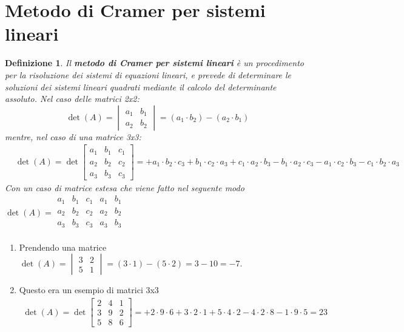 \documentclass{article}
\newtheorem{defi}{Definizione}[section]
\begin{document}
\section{Metodo di Cramer per sistemi lineari}
\label{sec:Metododicramer}
\begin{defi}
  Il \textbf{metodo di Cramer per sistemi lineari} è un procedimento per la
  risoluzione dei sistemi di equazioni lineari, e prevede di determinare le
  soluzioni dei sistemi lineari quadrati mediante il calcolo del determinante
  assoluto. Nel caso delle matrici 2x2:
  \begin{equation}
    \label{eq:MotododiCrmer}
    \det(A)=
    \begin{vmatrix}
      a_1 & b_1\\
      a_2 & b_2
    \end{vmatrix} = (a_1\cdot b_2) - (a_2 \cdot b_1)
  \end{equation}
  mentre, nel caso di una matrice 3x3:
  \begin{align}&\det(A) = \det\begin{bmatrix}a_1 & b_1 & c_1 \\ a_2 & b_2 & c_2 \\ a_3 & b_3 &
c_3\end{bmatrix}={+a_1\cdot b_2\cdot c_3+ b_1 \cdot c_2 \cdot a_3 + c_1 \cdot a_2
                  \cdot b_3 - b_1 \cdot a_2 \cdot c_3 - a_1 \cdot c_2 \cdot b_3 - c_1\cdot b_2 \cdot a_3}
  \end{align}
  Con un caso di matrice estesa che viene fatto nel seguente modo $
  \det(A)=\begin{array}{|ccc|cc} 
    a_1&b_1&c_1&a_1&b_1\\ 
    a_2&b_2&c_2&a_2&b_2\\
    a_3&b_3&c_3&a_3&b_3\\
  \end{array}
  $
\end{defi}
\begin{enumerate}
\item Prendendo una matrice $
\det(A)=\begin{vmatrix}
    3 & 2 \\
    5 & 1
\end{vmatrix}= (3\cdot 1)-(5\cdot 2)= 3-10=-7
$.
\item Questo era un esempio di matrici 3x3
  \begin{eqnarray*}
    \det(A)=\det\begin{bmatrix}
      2 & 4 & 1\\
      3 & 9 & 2\\
      5 & 8 & 6        
            \end{bmatrix}= +2\cdot 9\cdot 6+3\cdot 2 \cdot 1 + 5\cdot 4\cdot 2-
    4\cdot2\cdot 8-1\cdot9\cdot 5=23
  \end{eqnarray*}
\end{enumerate}
\end{document}
